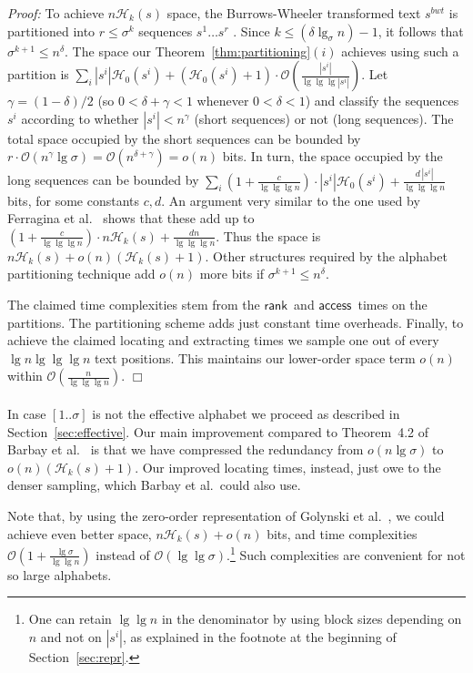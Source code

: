 \documentclass[11pt]{article}
\newenvironment{proof}{\textit{Proof:}}{\hfill$\Box$ \paragraph{} }
\newcommand{\Oh}[1]
    {\ensuremath{\mathcal{O}\left( {#1} \right)}}
\newcommand{\access}
    {\ensuremath{\mathsf{access}}}
\newcommand{\rank}
    {\ensuremath{\mathsf{rank}}}
\newcommand{\HH}{\mathcal{H}}
\newcommand{\Ho}{\HH_0}
\newcommand{\Hk}{\HH_k}
\begin{document}
\begin{proof}
To achieve $n\Hk(s)$ space, the Burrows-Wheeler transformed text $s^{bwt}$ is 
partitioned into $r \le \sigma^k$ sequences $s^1 \ldots s^r$ \cite{FMMN07}. 
Since $k \le (\delta\lg_\sigma n)-1$, it follows that $\sigma^{k+1} \le
n^\delta$. The space our Theorem~\ref{thm:partitioning}$(i)$ achieves using 
such a partition is 
$\sum_i |s^i|\Ho(s^i) + (\Ho(s^i)+1)\cdot\Oh{\frac{|s^i|}{\lg\lg\lg|s^i|}}$.
Let $\gamma = (1-\delta)/2$ (so $0<\delta+\gamma<1$ whenever $0<\delta<1$) and 
classify the sequences $s^i$ according to whether $|s^i| < n^\gamma$ (short 
sequences) or not (long sequences). The total space occupied by the short 
sequences can be bounded by $r \cdot \Oh{n^\gamma \lg\sigma} = 
\Oh{n^{\delta+\gamma}} = o(n)$ bits. In turn, the space occupied by the
long sequences can be bounded by
$\sum_i \left(1+\frac{c}{\lg\lg\lg n}\right)\cdot|s^i|\Ho(s^i) + 
 \frac{d\,|s^i|}{\lg\lg\lg n}$ bits, for some constants $c,d$. An argument very
similar to the one used by Ferragina et al.~\cite[Thm.~4.2]{FMMN07} shows
that these add up to 
$\left(1+\frac{c}{\lg\lg\lg n}\right)\cdot n\Hk(s) + 
 \frac{dn}{\lg\lg\lg n}$. Thus the space
is $n\Hk(s) + o(n)(\Hk(s)+1)$. Other structures required by the alphabet
partitioning technique \cite{FMMN07} add $o(n)$ more bits if $\sigma^{k+1}
\le n^\delta$.

The claimed time complexities stem from the
\rank\ and \access\ times on the partitions.
The partitioning scheme \cite{FMMN07} adds
just constant time overheads. Finally, to achieve the claimed locating and 
extracting times we sample one out of every $\lg n \lg\lg\lg n$ text positions.
This maintains our lower-order space term $o(n)$ within 
$\Oh{\frac{n}{\lg\lg\lg n}}$. 
\end{proof}

In case $[1..\sigma]$ is not the effective alphabet we proceed as described 
in Section~\ref{sec:effective}.
Our main improvement compared to Theorem~4.2 of Barbay et al.~\cite{BHMR07}
is that we have compressed the redundancy from $o(n\lg\sigma)$ to 
$o(n)(\Hk(s)+1)$. Our improved locating times, instead, just owe to the denser
sampling, which Barbay et al.\ could also use.

Note that, by using the zero-order representation of Golynski et
al.~\cite[Thm.~4]{GRR08}, we
could achieve even better space, $n\Hk(s)+o(n)$ bits, and time complexities
$\Oh{1+\frac{\lg\sigma}{\lg\lg n}}$ instead of $\Oh{\lg\lg\sigma}$.\footnote{One can retain $\lg\lg n$ 
in the denominator by using block sizes depending on $n$ and not on $|s^i|$, 
as explained in the footnote at the beginning of Section~\ref{sec:repr}.}
Such complexities are convenient for not so large alphabets.
\end{document}
